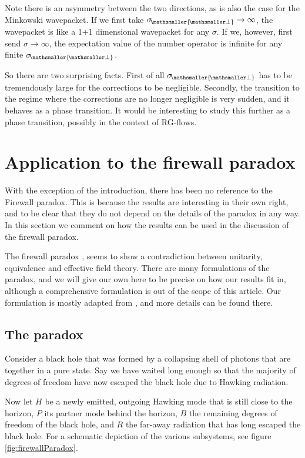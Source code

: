 \documentclass[11pt, a4paper]{article}
\newcommand{\si}{{\sigma}}
\let\perptmp\perp
\renewcommand{\perp}{{\! \mathsmaller{\perptmp}}}
\begin{document}
Note there is an asymmetry between the two directions, as is also the case for the Minkowski wavepacket. If we first take $\si_\perp\to\infty$, the wavepacket is like a 1+1 dimensional wavepacket for any $\si$. If we, however, first send $\si\to\infty$, the expectation value of the number operator is infinite for any finite $\si_\perp$.  

So there are two surprising facts. First of all $\si_\perp$ has to be tremendously large for the corrections to be negligible. Secondly, the transition to the regime where the corrections are no longer negligible is very sudden, and it behaves as a phase transition. It would be interesting to study this further as a phase transition, possibly in the context of RG-flows. 

\section{Application to the firewall paradox}
\label{sec:applicationToTheFirewallParadox}
With the exception of the introduction, there has been no reference to the Firewall paradox. This is because the results are interesting in their own right, and to be clear that they do not depend on the details of the paradox in any way. In this section we comment on how the results can be used in the discussion of the firewall paradox. 

The firewall paradox \cite{AMPS}, seems to show a contradiction between unitarity, equivalence and effective field theory. There are many formulations of the paradox, and we will give our own here to be precise on how our results fit in, although a comprehensive formulation is out of the scope of this article.  Our formulation is mostly adapted from \cite{HarlowHayden}, and more details can be found there. 

\subsection{The paradox}
Consider a black hole that was formed by a collapsing shell of photons that are together in a pure state. Say we have waited long enough so that the majority of degrees of freedom have now escaped the black hole due to Hawking radiation. 

Now let $H$ be a newly emitted, outgoing Hawking mode that is still close to the horizon, $P$ its partner mode behind the horizon, $B$ the remaining degrees of freedom of the black hole, and $R$ the far-away radiation that has long escaped the black hole. For a schematic depiction of the various subsystems, see figure \ref{fig:firewallParadox}. 
\end{document}
